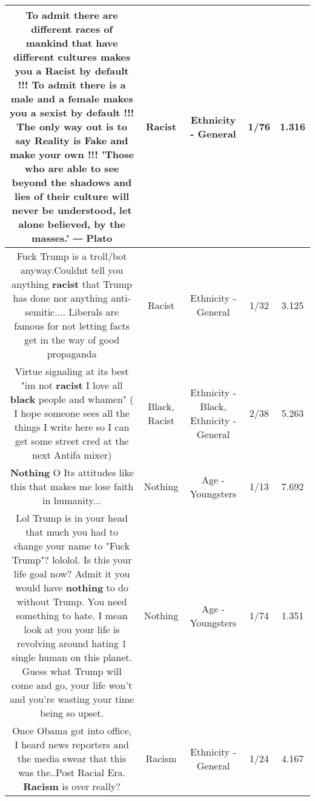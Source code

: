 \documentclass[11pt]{article}
\newlength\mylength
\begin{document}
\begin{center}
\begin{longtable}{|C{.65\mylength}|C{.30\mylength}|C{.12\mylength}|C{.12\mylength}|C{.12\mylength}|}
  \small To admit there are different races of mankind that have different cultures makes you a \textbf{Racist} by default !!!   To admit there is a male and a female makes you a sexist by default !!!   The only way out is to say Reality is Fake and make your own !!! 'Those who are able to see beyond the shadows and lies of their culture will never be understood, let alone believed, by the masses.'  ― Plato\normalsize   & Racist & Ethnicity - General & 1/76 & 1.316 \\  \hline
  \small Fuck Trump  is a troll/bot anyway.Couldnt tell you anything \textbf{racist} that Trump has done nor anything anti-semitic....  Liberals are famous for not letting facts get in the way of good propaganda\normalsize   & Racist & Ethnicity - General & 1/32 & 3.125 \\  \hline
  \small Virtue signaling at its best "im not \textbf{racist} I love all \textbf{black} people and whamen" ( I hope someone sees all the things I write here so I can get some street cred at the next Antifa mixer)\normalsize   & Black, Racist & Ethnicity - Black, Ethnicity - General & 2/38 & 5.263 \\  \hline
  \small \@\textbf{Nothing} O Its attitudes like this that makes me lose faith in humanity...\normalsize   & Nothing & Age - Youngsters & 1/13 & 7.692 \\  \hline
  \small Lol Trump is in your head that much you had to change your name to "Fuck Trump"? lololol. Is this your life goal now? Admit it you would have \textbf{nothing} to do without Trump. You need something to hate. I mean look at you your life is revolving around hating 1 single human on this planet. Guess what Trump will come and go, your life won't and you're wasting your time being so upset.\normalsize   & Nothing & Age - Youngsters & 1/74 & 1.351 \\  \hline
  \small Once Obama got into office, I heard news reporters and the media swear that this was the..Post Racial Era. \textbf{Racism} is over really?\normalsize   & Racism & Ethnicity - General & 1/24 & 4.167 \\  \hline

\end{longtable}
\end{center}
\end{document}
